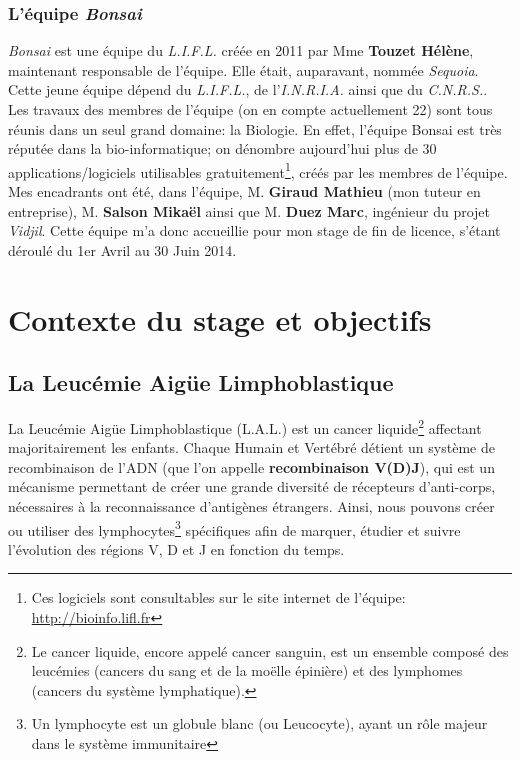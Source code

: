 \documentclass[12pt]{report}
\begin{document}
\begin{spacing}{1.2}
\subsection{L'équipe \textit{Bonsai}}
\textit{Bonsai} est une équipe du \textit{L.I.F.L.} créée en 2011 par Mme \textbf{Touzet Hélène}, maintenant responsable de l'équipe. Elle était, auparavant, nommée \textit{Sequoia}.
\newline
Cette jeune équipe dépend du \textit{L.I.F.L.}, de l'\textit{I.N.R.I.A.} ainsi que du \textit{C.N.R.S.}.
\newline
Les travaux des membres de l'équipe (on en compte actuellement 22) sont tous réunis dans un seul grand domaine: la Biologie.
\newline
En effet, l'équipe Bonsai est très réputée dans la bio-informatique; on dénombre aujourd'hui plus de 30 applications/logiciels utilisables gratuitement\footnote{Ces logiciels sont consultables sur le site internet de l'équipe: \url{http://bioinfo.lifl.fr}}, créés par les membres de l'équipe.
\newline
Mes encadrants ont été, dans l'équipe, M. \textbf{Giraud Mathieu} (mon tuteur en entreprise), M. \textbf{Salson Mikaël} ainsi que M. \textbf{Duez Marc}, ingénieur du projet \textit{Vidjil}.
\newline
Cette équipe m'a donc accueillie pour mon stage de fin de licence, s'étant déroulé du 1er Avril au 30 Juin 2014.


\chapter{Contexte du stage et objectifs}

\section{La Leucémie Aigüe Limphoblastique}
La Leucémie Aigüe Limphoblastique (L.A.L.) est un cancer liquide\footnote{Le cancer liquide, encore appelé cancer sanguin, est un ensemble composé des leucémies (cancers du sang et de la moëlle épinière) et des lymphomes (cancers du système lymphatique).} affectant majoritairement les enfants.
\newline
Chaque Humain et Vertébré détient un système de recombinaison de l'ADN (que l'on appelle \textbf{recombinaison V(D)J}), qui est un mécanisme permettant de créer une grande diversité de récepteurs d'anti-corps, nécessaires à la reconnaissance d'antigènes étrangers.
\newline
Ainsi, nous pouvons créer ou utiliser des lymphocytes\footnote{Un lymphocyte est un globule blanc (ou Leucocyte), ayant un rôle majeur dans le système immunitaire} spécifiques afin de marquer, étudier et suivre l'évolution des régions V, D et J en fonction du temps.


\end{spacing}
\end{document}
